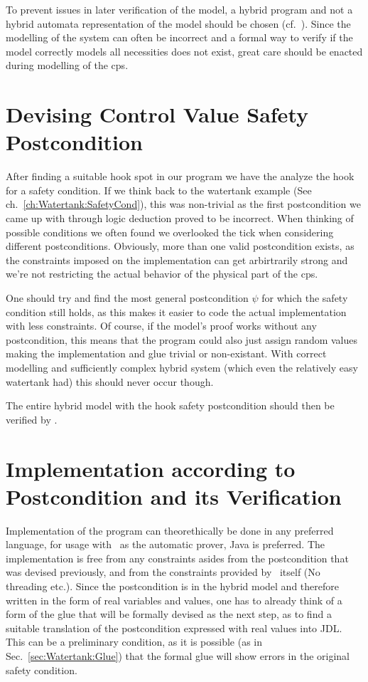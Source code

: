 To prevent issues in later verification of the model, a hybrid program and not a hybrid automata representation of the model should be chosen (cf.~\cite[ch.~1.1.4]{platzer2010b}). Since the modelling of the system can often be incorrect and a formal way to verify if the model correctly models all necessities does not exist, great care should be enacted during modelling of the cps.

\section{Devising Control Value Safety Postcondition}
\label{sec:Process:SafetyCond}

After finding a suitable hook spot in our program we have the analyze the hook for a safety condition. If we think back to the watertank example (See ch.~\ref{ch:Watertank:SafetyCond}), this was non-trivial as the first postcondition we came up with through logic deduction proved to be incorrect. When thinking of possible conditions we often found we overlooked the tick when considering different postconditions. Obviously, more than one valid postcondition exists, as the constraints imposed on the implementation can get arbirtrarily strong and we're not restricting the actual behavior of the physical part of the cps. 

One should try and find the most general postcondition \(\psi\) for which the safety condition still holds, as this makes it easier to code the actual implementation with less constraints. Of course, if the model's proof works without any postcondition, this means that the program could also just assign random values making the implementation and glue trivial or non-existant. With correct modelling and sufficiently complex hybrid system (which even the relatively easy watertank had) this should never occur though.

The entire hybrid model with the hook safety postcondition should then be verified by \keym.

\section{Implementation according to Postcondition and its Verification}
\label{sec:Process:Implementation}

Implementation of the program can theorethically be done in any preferred language, for usage with \key~as the automatic prover, Java is preferred. The implementation is free from any constraints asides from the postcondition that was devised previously, and from the constraints provided by \key~itself (No threading etc.). Since the postcondition is in the hybrid model and therefore written in the form of real variables and values, one has to already think of a form of the glue that will be formally devised as the next step, as to find a suitable translation of the postcondition expressed with real values into JDL. This can be a preliminary condition, as it is possible (as in Sec.~\ref{sec:Watertank:Glue}) that the formal glue will show errors in the original safety condition.

